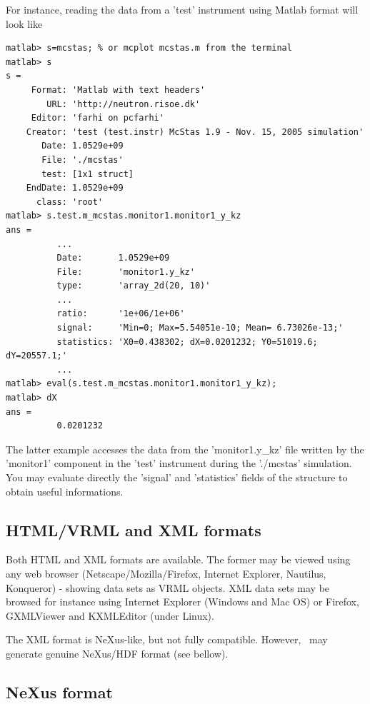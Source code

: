 For instance, reading the data from a 'test' instrument using Matlab format will look like
\begin{verbatim}
matlab> s=mcstas; % or mcplot mcstas.m from the terminal
matlab> s
s =
     Format: 'Matlab with text headers'
        URL: 'http://neutron.risoe.dk'
     Editor: 'farhi on pcfarhi'
    Creator: 'test (test.instr) McStas 1.9 - Nov. 15, 2005 simulation'
       Date: 1.0529e+09
       File: './mcstas'
       test: [1x1 struct]
    EndDate: 1.0529e+09
      class: 'root'
matlab> s.test.m_mcstas.monitor1.monitor1_y_kz
ans =
          ...
          Date:       1.0529e+09
          File:       'monitor1.y_kz'
          type:       'array_2d(20, 10)'
          ...
          ratio:      '1e+06/1e+06'
          signal:     'Min=0; Max=5.54051e-10; Mean= 6.73026e-13;'
          statistics: 'X0=0.438302; dX=0.0201232; Y0=51019.6; dY=20557.1;'
          ...
matlab> eval(s.test.m_mcstas.monitor1.monitor1_y_kz);
matlab> dX
ans =
          0.0201232
\end{verbatim}
The latter example accesses the data from the 'monitor1.y\_kz' file written by the 'monitor1' component in the 'test' instrument during the './mcstas' simulation. You may evaluate directly the 'signal' and 'statistics' fields of the structure to obtain useful informations.

\subsection{HTML/VRML and XML formats}
  

Both HTML and XML formats are available. The former may be viewed using any web browser (Netscape/Mozilla/Firefox, Internet Explorer, Nautilus, Konqueror) - showing data sets as VRML objects. XML data sets may be browsed for instance using Internet Explorer (Windows and Mac OS) or Firefox, GXMLViewer and KXMLEditor (under Linux).

The XML format is NeXus-like, but not fully compatible. However, \MCS\ may generate genuine NeXus/HDF format (see bellow).

\subsection{NeXus format}
  
\label{r:nexus}

